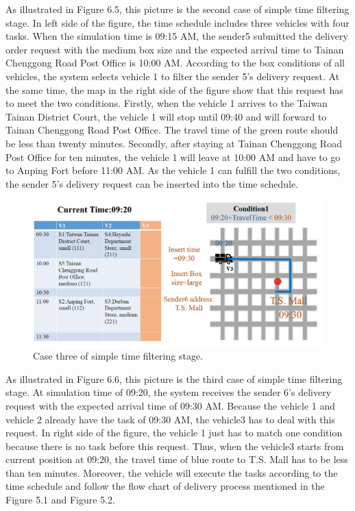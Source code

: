 \documentclass[12pt]{ksthesis}
\begin{document}
\begin{thesis}
{As illustrated in Figure 6.5, this picture is the second case of simple time filtering stage. In left side of the figure, the time schedule includes three vehicles with four tasks. When the simulation time is 09:15 AM, the sender5 submitted the delivery order request with the medium box size and the expected arrival time to Tainan Chenggong Road Post Office is 10:00 AM.
According to the box conditions of all vehicles, the system selects vehicle 1 to filter the sender 5’s delivery request. At the same time, the map in the right side of the figure show that this request has to meet the two conditions. Firstly, when the vehicle 1 arrives to the Taiwan Tainan District Court, the vehicle 1 will stop until 09:40 and will forward to Tainan Chenggong Road Post Office. The travel time of the green route should be less than twenty minutes. Secondly, after staying at Tainan Chenggong Road Post Office for ten minutes, the vehicle 1 will leave at 10:00 AM and have to go to Anping Fort before 11:00 AM. 
As the vehicle 1 can fulfill the two conditions, the sender 5’s delivery request can be inserted into the time schedule.


\begin{figure}[H]
\centering
\includegraphics[width=1.14\textwidth]{./Thesis_figures/F6-6_caseThree_SchedulingStage.PNG}
\caption{\large Case three of simple time filtering stage.}
\vspace{0.5cm}
\label{Fig:CaseThree_TimeFiltering}
\end{figure}

As illustrated in Figure 6.6, this picture is the third case of simple time filtering stage. At simulation time of 09:20, the system receives the sender 6’s delivery request with the expected arrival time of 09:30 AM. Because the vehicle 1 and vehicle 2 already have the task of 09:30 AM, the vehicle3 has to deal with this request. In right side of the figure, the vehicle 1 just has to match one condition because there is no task before this request. Thus, when the vehicle3 starts from current position at 09:20, the travel time of blue route to T.S. Mall has to be less than ten minutes.
Moreover, the vehicle will execute the tasks according to the time schedule and follow the flow chart of delivery process mentioned in the Figure 5.1 and Figure 5.2.


}
\end{thesis}
\end{document}
